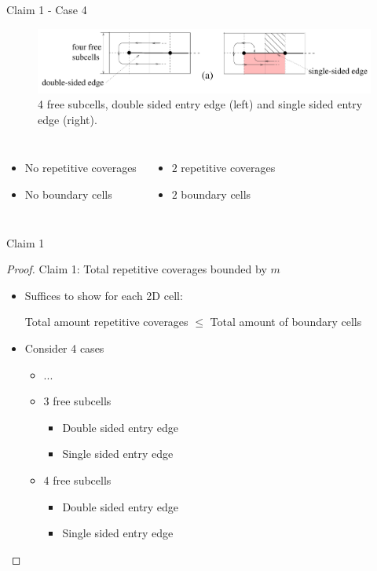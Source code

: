 \documentclass{beamer}
\begin{document}
\begin{frame}{Claim 1 - Case 4}
    \begin{figure}
        \includegraphics[width=\linewidth]{Images/inv_10_top.png}
        \caption{4 free subcells, double sided entry edge (left) and single sided entry edge (right).}
    \end{figure}
    \begin{columns}
        \begin{itemize}
            \item No repetitive coverages
            \item No boundary cells
        \end{itemize}

        \begin{itemize}
            \item $2$ repetitive coverages
            \item $2$ boundary cells
        \end{itemize}
    \end{columns}
\end{frame}
\begin{frame}{Claim 1}
    \begin{proof}
        Claim 1: Total repetitive coverages bounded by $m$
        \begin{itemize}
            \item Suffices to show for each 2D cell:

                  Total amount repetitive coverages $\leq$ Total amount of boundary cells
            \item Consider 4 cases
                  \begin{itemize}
                      \item ...
                      \item 3 free subcells
                            \begin{itemize}
                                \item Double sided entry edge
                                \item Single sided entry edge
                            \end{itemize}
                      \item 4 free subcells
                            \begin{itemize}
                                \item Double sided entry edge
                                \item Single sided entry edge
                            \end{itemize}
                  \end{itemize}
        \end{itemize}
    \end{proof}
\end{frame}
\end{document}
